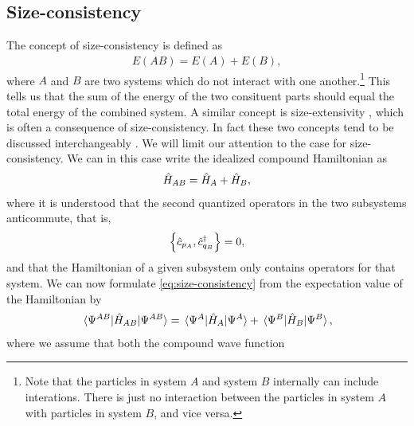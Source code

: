         \subsection{Size-consistency}
            \label{subsec:size-consistency}
            The concept of size-consistency is defined as
            \cite{pople-size-consistency}
            \begin{align}
                E(AB) = E(A) + E(B),
                \label{eq:size-consistency}
            \end{align}
            where $A$ and $B$ are two systems which do not interact with one
            another.\footnote{%
                Note that the particles in system $A$ and system $B$ internally
                can include interations.
                There is just no interaction between the particles in system $A$
                with particles in system $B$, and vice versa.
            }
            This tells us that the sum of the energy of the two consituent parts
            should equal the total energy of the combined system.
            A similar concept is size-extensivity \cite{shavitt2009many}, which
            is often a consequence of size-consistency.
            In fact these two concepts tend to be discussed interchangeably
            \cite{size-extensivity, helgaker-molecular}.
            We will limit our attention to the case for size-consistency.
            We can in this case write the idealized compound Hamiltonian as
            \begin{align}
                \hat{H}_{AB}
                = \hat{H}_A + \hat{H}_B,
                \label{eq:additively-separable}
            \end{align}
            where it is understood that the second quantized operators in the
            two subsystems anticommute, that is,
            \begin{align}
                \left\{\hat{c}_{{p_A}}, \hat{c}_{{q_B}}^{\dagger}\right\} = 0,
            \end{align}
            and that the Hamiltonian of a given subsystem only contains
            operators for that system.
            We can now formulate \autoref{eq:size-consistency} from the
            expectation value of the Hamiltonian by
            \begin{align}
                \mel*{\Psi^{AB}}{\hat{H}_{AB}}{\Psi^{AB}}
                = \mel*{\Psi^{A}}{\hat{H}_{A}}{\Psi^{A}}
                + \mel*{\Psi^{B}}{\hat{H}_{B}}{\Psi^{B}},
            \end{align}
            where we assume that both the compound wave function
